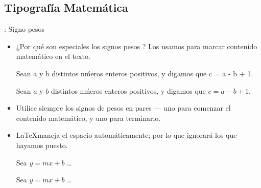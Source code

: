 \documentclass{beamer}
\begin{document}
\subsection{Tipografía Matemática}
\begin{frame}[fragile]{\insertsubsection{}: Signo pesos}
  \begin{itemize}
  \item ¿Por qué son especiales los signos pesos \keystrokebftt{\$}? Los
    usamos para marcar contenido  matemático en el texto.\\[1ex]
    \begin{exampletwouptiny}
Sean a y b distintos n\'meros 
enteros positivos, y digamos 
que c = a - b + 1.
      
Sean $a$ y $b$ distintos n\'meros
enteros positivos, y digamos 
que  $c = a - b + 1$.
    \end{exampletwouptiny}
  \item Utilice siempre los signos de pesos en pares --- uno para
    comenzar el contenido matemático, y uno para terminarlo.
  \item \LaTeX maneja el espacio automáticamente; por lo que
    ignorará los que hayamos puesto.
    \begin{exampletwouptiny}
Sea $y=mx+b$ \ldots
      
Sea $y = m x + b$ \ldots
    \end{exampletwouptiny}
  \end{itemize}
\end{frame}
\end{document}
